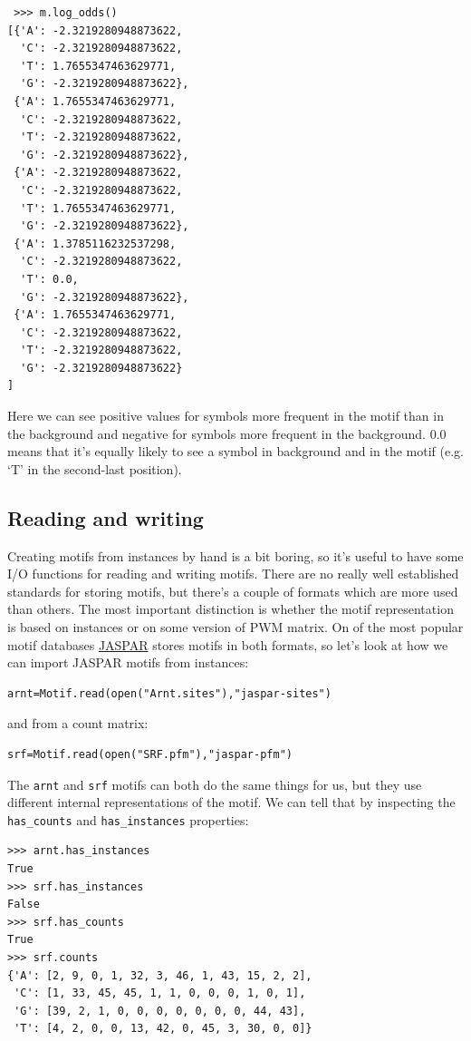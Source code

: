 \documentclass{report}
\begin{document}
\begin{verbatim}
 >>> m.log_odds() 
[{'A': -2.3219280948873622, 
  'C': -2.3219280948873622, 
  'T': 1.7655347463629771, 
  'G': -2.3219280948873622}, 
 {'A': 1.7655347463629771, 
  'C': -2.3219280948873622, 
  'T': -2.3219280948873622, 
  'G': -2.3219280948873622}, 
 {'A': -2.3219280948873622, 
  'C': -2.3219280948873622, 
  'T': 1.7655347463629771, 
  'G': -2.3219280948873622}, 
 {'A': 1.3785116232537298, 
  'C': -2.3219280948873622, 
  'T': 0.0, 
  'G': -2.3219280948873622}, 
 {'A': 1.7655347463629771, 
  'C': -2.3219280948873622, 
  'T': -2.3219280948873622, 
  'G': -2.3219280948873622}
]
\end{verbatim}
Here we can see positive values for symbols more frequent in the motif
than in the background and negative for symbols more frequent in the
background. $0.0$ means that it's equally likely to see a symbol in
background and in the motif (e.g. `T' in the second-last position).

\subsection{Reading and writing}
\label{sec:io}

Creating motifs from instances by hand is a bit boring, so it's
useful to have some I/O functions for reading and writing
motifs. There are no really well established standards for storing
motifs, but there's a couple of formats which are more used than
others. The most important distinction is whether the motif
representation is based on instances or on some version of PWM matrix.
On of the most popular motif databases \href{http://jaspar.genereg.net}{JASPAR}
 stores motifs in both formats, so
let's look at how we can import JASPAR motifs from instances:
\begin{verbatim}
arnt=Motif.read(open("Arnt.sites"),"jaspar-sites")
\end{verbatim}
and from a count matrix:
\begin{verbatim}
srf=Motif.read(open("SRF.pfm"),"jaspar-pfm")
\end{verbatim}

The \verb|arnt| and \verb|srf| motifs can both do the same things for
us, but they use different internal representations of the motif. We
can tell that by inspecting the \verb|has_counts| and
\verb|has_instances| properties:
\begin{verbatim}
>>> arnt.has_instances
True
>>> srf.has_instances
False
>>> srf.has_counts
True
>>> srf.counts
{'A': [2, 9, 0, 1, 32, 3, 46, 1, 43, 15, 2, 2],
 'C': [1, 33, 45, 45, 1, 1, 0, 0, 0, 1, 0, 1],
 'G': [39, 2, 1, 0, 0, 0, 0, 0, 0, 0, 44, 43],
 'T': [4, 2, 0, 0, 13, 42, 0, 45, 3, 30, 0, 0]}
\end{verbatim}
\end{document}
